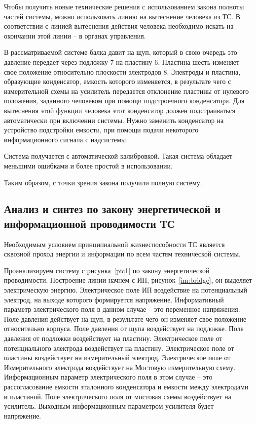 Чтобы получить новые технические решения с использованием закона полноты частей системы, можно использовать линию на вытеснение человека из ТС. В соответствии с
линией вытеснения действия человека необходимо искать на окончании этой линии -- в органах управления.

В рассматриваемой системе балка давит на щуп, который в свою очередь это давление передает через подложку 7 на пластину 6. Пластина шесть изменяет свое положение относительно плоскости электродов 8. Электроды и пластина, образующие конденсатор, емкость которого изменяется, в результате чего с измерительной схемы на усилитель передается отклонение пластины от нулевого положения, заданного человеком при помощи подстроечного конденсатора. Для вытеснения этой функции человека этот конденсатор должен подстраиваться автоматически при включении системы. Нужно заменить конденсатор на устройство подстройки емкости, при помощи подачи некоторого информационного сигнала 
с надсистемы.

Система получается с автоматической калибровкой. Такая система обладает меньшими ошибками и более простой в использовании. 

Таким образом, с точки зрения закона получили полную систему.


\subsection{Анализ и синтез по закону энергетической и информационной проводимости ТС}


Необходимым условием принципиальной жизнеспособности ТС является сквозной проход энергии и информации по всем частям технической системы. 

Проанализируем систему с рисунка~\ref{pic1} по закону энергетической проводимости. Построение линии начнем с ИП, рисунок~\ref{im:bridge}, он выделяет электрическую энергию. Электрическое поле ИП воздействие на потенциальный электрод, на выходе которого формируется напряжение. Информативный параметр электрического поля в данном случае -- это переменное напряжения. 
Поле давления действует на щуп, в результате чего он изменяет свое положение относительно корпуса. 
Поле давления от щупа воздействует на подложке. Поле давления от подложки воздействует на пластину. Электрическое поле от потенциального электрода воздействует на пластину. Электрическое поле от пластины воздействует на измерительный электрод. Электрическое поле от Измерительного электрода воздействует на Мостовую измерительную схему. Информационным параметр электрического поля в этом случае -- это рассогласование емкости эталонного конденсатора и емкости между электродами и пластиной. Поле электрического поля от мостовая схемы воздействует на усилитель. Выходным информационным параметром усилителя будет напряжение.


